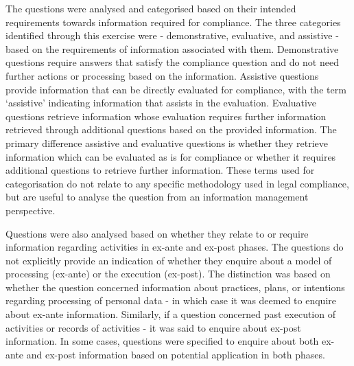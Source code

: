 The questions were analysed and categorised based on their intended requirements towards information required for compliance. The three categories identified through this exercise were - demonstrative, evaluative, and assistive - based on the requirements of information associated with them. 
Demonstrative questions require answers that satisfy the compliance question and do not need further actions or processing based on the information. 
Assistive questions provide information that can be directly evaluated for compliance, with the term `assistive' indicating information that assists in the evaluation.
Evaluative questions retrieve information whose evaluation requires further information retrieved through additional questions based on the provided information.
The primary difference assistive and evaluative questions is whether they retrieve information which can be evaluated as is for compliance or whether it requires additional questions to retrieve further information.
These terms used for categorisation do not relate to any specific methodology used in legal compliance, but are useful to analyse the question from an information management perspective.

Questions were also analysed based on whether they relate to or require information regarding activities in ex-ante and ex-post phases.
The questions do not explicitly provide an indication of whether they enquire about a model of processing (ex-ante) or the execution (ex-post). The distinction was based on whether the question concerned information about practices, plans, or intentions regarding processing of personal data - in which case it was deemed to enquire about ex-ante information.
Similarly, if a question concerned past execution of activities or records of activities - it was said to enquire about ex-post information.
In some cases, questions were specified to enquire about both ex-ante and ex-post information based on potential application in both phases.

